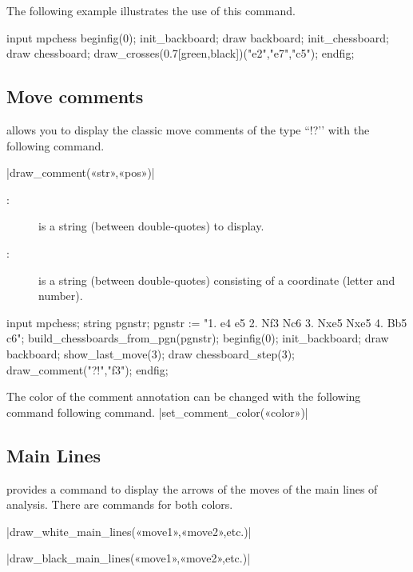 \documentclass[english]{ltxdoc}
\begin{document}
The following example illustrates the use of this command.

  
\begin{ExempleMP}
input mpchess
beginfig(0);
init_backboard;
draw backboard;
init_chessboard;
draw chessboard;
draw_crosses(0.7[green,black])("e2","e7","c5");
endfig;
\end{ExempleMP}

\subsection{Move comments}

\mpchess allows you to display the classic move comments of the type
``!?’’ with the following command.

\commande|draw_comment(«str»,«pos»)|\smallskip

\begin{description}
\item[:] is a string (between double-quotes) to display.
\item[:] is a string (between double-quotes) consisting of a coordinate (letter and number).
\end{description}

\begin{ExempleMP}
input mpchess;
string pgnstr;
pgnstr := "1. e4 e5 2. Nf3 Nc6 3. Nxe5 Nxe5 4. Bb5 c6";
build_chessboards_from_pgn(pgnstr);
beginfig(0);
init_backboard;
draw backboard;
show_last_move(3);
draw chessboard_step(3); %
draw_comment("?!","f3");
endfig;
\end{ExempleMP}

The color of the comment annotation can be changed with the following command
following command.
\commande|set_comment_color(«color»)|\smallskip


\subsection{Main Lines}

\mpchess provides a command to display the arrows of the moves of the
main lines of analysis. There are commands for both colors. 

\commande|draw_white_main_lines(«move1»,«move2»,etc.)|\smallskip

\commande|draw_black_main_lines(«move1»,«move2»,etc.)|\smallskip
\end{document}
